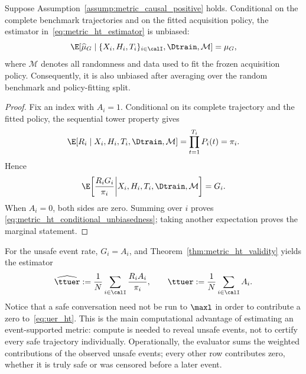\begin{theorem}
\label{thm:metric_ht_validity}
Suppose Assumption~\ref{assump:metric_causal_positive} holds.  Conditional on
the complete benchmark trajectories and on the fitted acquisition policy,
the estimator in~\eqref{eq:metric_ht_estimator} is unbiased:
\begin{equation}
    \E\!\left[\widehat\mu_G\mid
    \{X_i,H_i,T_i\}_{i\in\calI},\Dtrain,\mathcal{M}\right]
    = \mu_G,
    \label{eq:metric_ht_conditional_unbiasedness}
\end{equation}
where $\mathcal{M}$ denotes all randomness and data used to fit the frozen
acquisition policy.  Consequently, it is also unbiased after averaging over
the random benchmark and policy-fitting split.
\end{theorem}

\begin{proof}
Fix an index with $A_i=1$.  Conditional on its complete trajectory and the
fitted policy, the sequential tower property gives
\begin{equation}
    \E[R_i\mid X_i,H_i,T_i,\Dtrain,\mathcal{M}]
    = \prod_{t=1}^{T_i}P_i(t)=\pi_i.
\end{equation}
Hence
\begin{equation}
    \E\!\left[\frac{R_iG_i}{\pi_i}\middle|
    X_i,H_i,T_i,\Dtrain,\mathcal{M}\right]=G_i.
\end{equation}
When $A_i=0$, both sides are zero.  Summing over $i$ proves
\eqref{eq:metric_ht_conditional_unbiasedness}; taking another expectation
proves the marginal statement.
\end{proof}

For the unsafe event rate, $G_i=A_i$, and Theorem~\ref{thm:metric_ht_validity}
yields the estimator
\begin{equation}
    \widehat{\ttuer}
    :=\frac{1}{N}\sum_{i\in\calI}\frac{R_iA_i}{\pi_i},
    \qquad
    \ttuer:=\frac{1}{N}\sum_{i\in\calI}A_i.
    \label{eq:uer_ht}
\end{equation}
Notice that a safe conversation need not be run to $\maxl$ in order to
contribute a zero to~\eqref{eq:uer_ht}.  This is the main computational
advantage of estimating an event-supported metric: compute is needed to
reveal unsafe events, not to certify every safe trajectory individually.
Operationally, the evaluator sums the weighted contributions of the observed
unsafe events; every other row contributes zero, whether it is truly safe or
was censored before a later event.

